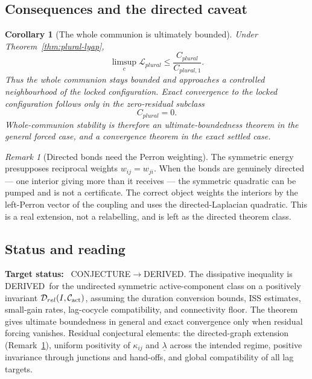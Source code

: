 \documentclass[11pt,a4paper]{article}
\def\mathfrak#1{#1}%
\def\mathrm#1{#1}%
\newcommand{\stDerived}{\textcolor{cDer}{\textsf{\small DERIVED}}}
\newcommand{\stConj}{\textcolor{cCon}{\textsf{\small CONJECTURE}}}
\theoremstyle{definition}
\theoremstyle{plain}
\newtheorem{corollary}[definition]{Corollary}
\theoremstyle{remark}
\newtheorem{remark}[definition]{Remark}
\begin{document}
\subsection{Consequences and the directed caveat}

\begin{corollary}[The whole communion is ultimately bounded]\label{cor:plural-bounded}
Under Theorem~\ref{thm:plural-lyap},
\[
\limsup_{\mathfrak c}\mathcal L_{\mathrm{plural}}
\le
\frac{C_{\mathrm{plural}}}{C_{\mathrm{plural},1}}.
\]
Thus the whole communion stays bounded and approaches a controlled neighbourhood
of the locked configuration. Exact convergence to the locked configuration follows
only in the zero-residual subclass
\[
C_{\mathrm{plural}}=0.
\]
Whole-communion stability is therefore an ultimate-boundedness theorem in the
general forced case, and a convergence theorem in the exact settled case.
\end{corollary}

\begin{remark}[Directed bonds need the Perron weighting]\label{rem:directed}
The symmetric energy presupposes reciprocal weights \(w_{ij}=w_{ji}\). When the bonds are
genuinely directed --- one interior giving more than it receives --- the symmetric quadratic
can be pumped and is not a certificate. The correct object weights the interiors by the
left-Perron vector of the coupling and uses the directed-Laplacian quadratic. This is a real
extension, not a relabelling, and is left as the directed theorem class.
\end{remark}

\subsection{Status and reading}

\textbf{Target status:}~
\stConj\(\to\)\stDerived. The dissipative inequality is \stDerived\ for the
undirected symmetric active-component class on a positively invariant
\(\mathcal D_{\mathrm{rel}}(I,\mathcal C_{\rm act})\), assuming the duration
conversion bounds, ISS estimates, small-gain rates, lag-cocycle compatibility, and
connectivity floor. The theorem gives ultimate boundedness in general and exact
convergence only when residual forcing vanishes. Residual conjectural elements:
the directed-graph extension (Remark~\ref{rem:directed}), uniform positivity of
\(\kappa_{ij}\) and
\(\underline\lambda\) across the intended regime, positive invariance through
junctions and hand-offs, and global compatibility of all lag targets.
\end{document}
